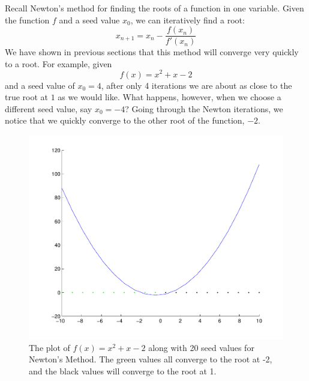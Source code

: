 


Recall Newton's method for finding the roots of a function in one variable.  Given the function $f$ and a seed value $x_0$, we can iteratively find a root:
\[
x_{n+1} = x_n - \frac{f(x_n)}{f'(x_n)}
\]
We have shown in previous sections that this method will converge very quickly to a root.  For example, given
\[
f(x) = x^2 + x -2
\]
and a seed value of $x_0 = 4$, after only 4 iterations we are about as close to the true root at $1$ as we would like.  What happens, however, when we choose a different seed value, say $x_0 = -4$?  Going through the Newton iterations, we notice that we quickly converge to the other root of the function, $-2$.

\begin{figure}
\begin{center}
\includegraphics[scale=0.5]{basins1}
\caption{The plot of $f(x) = x^2 + x - 2$ along with 20 seed values for Newton's Method.  The green values all converge to the root at -2, and the black values will converge to the root at 1.}
\label{Fig:basins1}
\end{center}
\end{figure}

